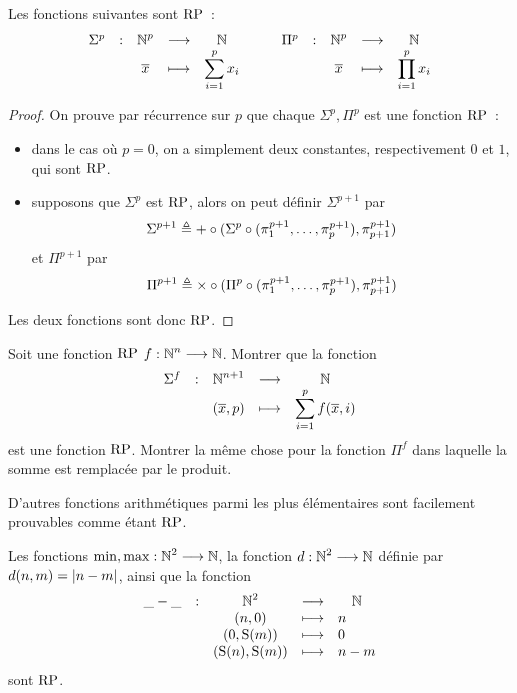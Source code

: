 \begin{proposition}
  Les fonctions suivantes sont $\operatorname{RP}$~:
  \[
  \makeFun{\Sigma^p}{\bN^p}{\bN}{\vec x}{\displaystyle\sum_{i = 1}^p x_i}
  \qquad
  \makeFun{\Pi^p}{\bN^p}{\bN}{\vec x}{\displaystyle\prod_{i = 1}^p x_i}
  \]
\end{proposition}

\begin{proof}
  On prouve par récurrence sur $p$ que chaque $\Sigma^p,\Pi^p$ est une fonction
  $\operatorname{RP}$~:
  \begin{itemize}
  \item dans le cas où $p = 0$, on a simplement deux constantes, respectivement
    $0$ et $1$, qui sont $\operatorname{RP}$.
  \item supposons que $\Sigma^p$ est $\operatorname{RP}$, alors on peut définir
    $\Sigma^{p+1}$ par
    \[\Sigma^{p+1} \triangleq \mathord{+}\circ
    (\Sigma^p \circ (\pi_1^{p+1},\ldots,\pi_p^{p+1}),
    \pi_{p+1}^{p+1})\]
    et $\Pi^{p+1}$ par
    \[\Pi^{p+1}\triangleq \mathord{\times}\circ
    (\Pi^p \circ (\pi_1^{p+1},\ldots,\pi_p^{p+1}),
    \pi_{p+1}^{p+1})\]
  \end{itemize}
  Les deux fonctions sont donc $\operatorname{RP}$.
\end{proof}

\begin{exercise}
  Soit une fonction $\operatorname{RP}$ $f : \displaystyle \mathbb N^n \longrightarrow \mathbb N$. Montrer que la
  fonction
  \[\makeFun{\Sigma^f}{\bN^{n+1}}{\bN}
            {(\vec x,p)}{\displaystyle\sum_{i = 1}^p f(\vec x, i)}\]
  est une fonction $\operatorname{RP}$. Montrer la même chose pour la fonction $\Pi^f$ dans
  laquelle la somme est remplacée par le produit.
\end{exercise}

D'autres fonctions arithmétiques parmi les plus élémentaires sont facilement
prouvables comme étant $\operatorname{RP}$.

\begin{proposition}
  Les fonctions $\min,\max : \displaystyle \mathbb N^2 \longrightarrow \mathbb N$, la fonction
  $d : \displaystyle \mathbb N^2 \longrightarrow \mathbb N$ définie par $d(n,m) = | n - m |$,
  ainsi que la fonction
  \[\makeFunTer{\tok - \tok}{\bN^2}{\bN}
               {(n,0)}{n}
               {(0,\Ss(m))}{0}
               {(\Ss(n),\Ss(m))}{n - m}\]
  sont $\operatorname{RP}$.
\end{proposition}

